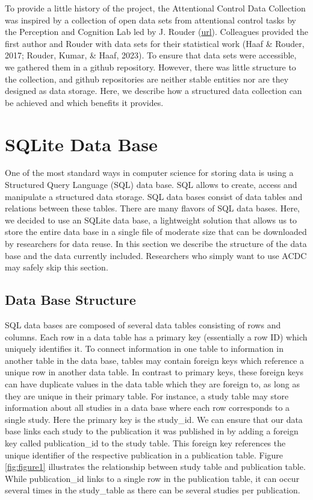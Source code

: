 \documentclass[
  man,floatsintext]{apa6}
\begin{document}
To provide a little history of the project, the Attentional Control Data Collection was inspired by a collection of open data sets from attentional control tasks by the Perception and Cognition Lab led by J. Rouder (\href{https://github.com/PerceptionCognitionLab/data0}{url}). Colleagues provided the first author and Rouder with data sets for their statistical work (Haaf \& Rouder, 2017; Rouder, Kumar, \& Haaf, 2023). To ensure that data sets were accessible, we gathered them in a github repository. However, there was little structure to the collection, and github repositories are neither stable entities nor are they designed as data storage. Here, we describe how a structured data collection can be achieved and which benefits it provides.

\hypertarget{sqlite-data-base}{%
\section{SQLite Data Base}\label{sqlite-data-base}}

One of the most standard ways in computer science for storing data is using a Structured Query Language (SQL) data base. SQL allows to create, access and manipulate a structured data storage. SQL data bases consist of data tables and relations between these tables. There are many flavors of SQL data bases. Here, we decided to use an SQLite data base, a lightweight solution that allows us to store the entire data base in a single file of moderate size that can be downloaded by researchers for data reuse. In this section we describe the structure of the data base and the data currently included. Researchers who simply want to use ACDC may safely skip this section.

\hypertarget{data-base-structure}{%
\subsection{Data Base Structure}\label{data-base-structure}}

SQL data bases are composed of several data tables consisting of rows and columns. Each row in a data table has a primary key (essentially a row ID) which uniquely identifies it. To connect information in one table to information in another table in the data base, tables may contain foreign keys which reference a unique row in another data table. In contrast to primary keys, these foreign keys can have duplicate values in the data table which they are foreign to, as long as they are unique in their primary table. For instance, a study table may store information about all studies in a data base where each row corresponds to a single study. Here the primary key is the study\_id. We can ensure that our data base links each study to the publication it was published in by adding a foreign key called publication\_id to the study table. This foreign key references the unique identifier of the respective publication in a publication table. Figure \ref{fig:figure1} illustrates the relationship between study table and publication table. While publication\_id links to a single row in the publication table, it can occur several times in the study\_table as there can be several studies per publication.
\end{document}
